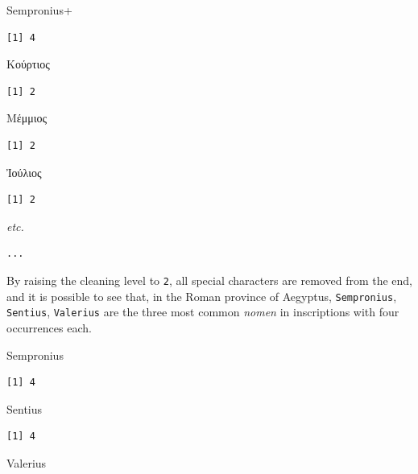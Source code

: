 \documentclass[a4paper,11pt]{memoir}
\newenvironment{Shaded}{\begin{snugshade}}{\end{snugshade}}
\newcommand{\CommentTok}[1]{\textcolor[rgb]{0.56,0.35,0.01}{\textit{#1}}}
\newcommand{\DataTypeTok}[1]{\textcolor[rgb]{0.13,0.29,0.53}{#1}}
\newcommand{\DecValTok}[1]{\textcolor[rgb]{0.00,0.00,0.81}{#1}}
\newcommand{\ErrorTok}[1]{\textcolor[rgb]{0.64,0.00,0.00}{\textbf{#1}}}
\newcommand{\KeywordTok}[1]{\textcolor[rgb]{0.13,0.29,0.53}{\textbf{#1}}}
\newcommand{\NormalTok}[1]{#1}
\newcommand{\OperatorTok}[1]{\textcolor[rgb]{0.81,0.36,0.00}{\textbf{#1}}}
\newcommand{\OtherTok}[1]{\textcolor[rgb]{0.56,0.35,0.01}{#1}}
\newcommand{\StringTok}[1]{\textcolor[rgb]{0.31,0.60,0.02}{#1}}
\begin{document}
Sempronius+

\begin{verbatim}
[1] 4
\end{verbatim}

Κούρτιος

\begin{verbatim}
[1] 2
\end{verbatim}

Μέμμιος

\begin{verbatim}
[1] 2
\end{verbatim}

Ἰούλιος

\begin{verbatim}
[1] 2
\end{verbatim}

\emph{etc.}

\begin{verbatim}
...
\end{verbatim}

By raising the cleaning level to \texttt{2}, all special characters are
removed from the end, and it is possible to see that, in the Roman
province of Aegyptus, \texttt{Sempronius}, \texttt{Sentius},
\texttt{Valerius} are the three most common \emph{nomen} in inscriptions
with four occurrences each.

\begin{Shaded}
\end{Shaded}

Sempronius

\begin{verbatim}
[1] 4
\end{verbatim}

Sentius

\begin{verbatim}
[1] 4
\end{verbatim}

Valerius
\end{document}
